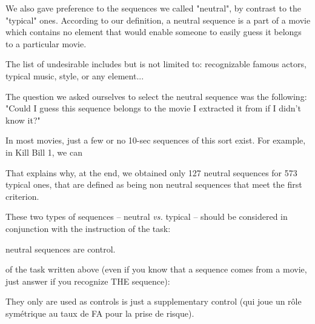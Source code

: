 \documentclass[sigconf]{acmart}
\begin{document}






We also gave preference to the sequences we called "neutral", by contrast to the "typical" ones.
According to our definition, a neutral sequence is a part of a movie which contains no element that would enable someone to easily guess it belongs to a particular movie.

The list of undesirable includes but is not limited to: recognizable famous actors, typical music, style, or any element... 

The question we asked ourselves to select the neutral sequence was the following: "Could I guess this sequence belongs to the movie I extracted it from if I didn't know it?"



In most movies, just a few or no 10-sec sequences of this sort exist. For example, in Kill Bill 1, we can 

That explains why, at the end, we obtained only 127 neutral sequences for 573 typical ones, that are defined as being non neutral sequences that meet the first criterion.


These two types of sequences -- neutral \textit{vs.} typical -- should be considered in conjunction with the instruction of the task: 

neutral sequences are control.

 of the task written above (even if you know that a sequence comes from a movie, just answer if you recognize THE sequence): 
 
They only are used as controls is just a supplementary control (qui joue un rôle symétrique au taux de FA pour la prise de risque).




\end{document}
